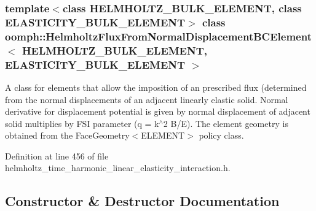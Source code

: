 \subsubsection*{template$<$class H\+E\+L\+M\+H\+O\+L\+T\+Z\+\_\+\+B\+U\+L\+K\+\_\+\+E\+L\+E\+M\+E\+NT, class E\+L\+A\+S\+T\+I\+C\+I\+T\+Y\+\_\+\+B\+U\+L\+K\+\_\+\+E\+L\+E\+M\+E\+NT$>$\newline
class oomph\+::\+Helmholtz\+Flux\+From\+Normal\+Displacement\+B\+C\+Element$<$ H\+E\+L\+M\+H\+O\+L\+T\+Z\+\_\+\+B\+U\+L\+K\+\_\+\+E\+L\+E\+M\+E\+N\+T, E\+L\+A\+S\+T\+I\+C\+I\+T\+Y\+\_\+\+B\+U\+L\+K\+\_\+\+E\+L\+E\+M\+E\+N\+T $>$}

A class for elements that allow the imposition of an prescribed flux (determined from the normal displacements of an adjacent linearly elastic solid. Normal derivative for displacement potential is given by normal displacement of adjacent solid multiplies by F\+SI parameter (q = k$^\wedge$2 B/E). The element geometry is obtained from the Face\+Geometry$<$\+E\+L\+E\+M\+E\+N\+T$>$ policy class. 

Definition at line 456 of file helmholtz\+\_\+time\+\_\+harmonic\+\_\+linear\+\_\+elasticity\+\_\+interaction.\+h.



\subsection{Constructor \& Destructor Documentation}
\mbox{\label{classoomph_1_1HelmholtzFluxFromNormalDisplacementBCElement_ae37a7a8b5ad9850527f9285f2325aa2c}} 
